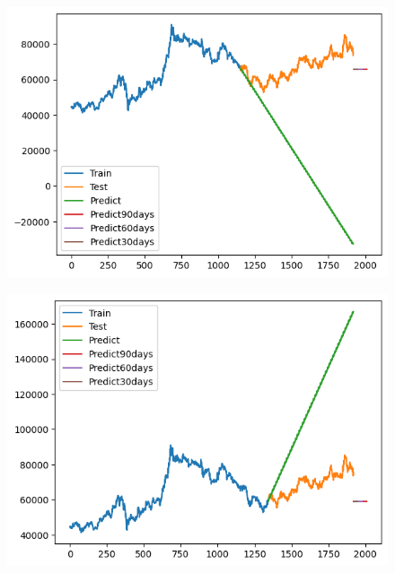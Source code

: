 \documentclass[conference]{IEEEtran}
\begin{document}
\begin{figure}[H]
    \centering
    \begin{minipage}{0.15\textwidth}
    \centering
    \includegraphics[width=1\textwidth]{Image/ARIMA/SAMSUNG_6_4_Arima.png}
   
    \label{fig:1}
    \end{minipage}%
    \begin{minipage}{0.15\textwidth}
    \centering
    \includegraphics[width=1\textwidth]{Image/ARIMA/SAMSUNG_7_3_Arima.png}
  

\end{minipage}
\end{figure}
\end{document}
